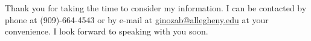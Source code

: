 \documentclass[11pt,a4paper,sans]{moderncv}        %
\begin{document}
Thank you for taking the time to consider my information. I can be contacted by phone at (909)-664-4543 or by e-mail at \href{mailto:ginozab@allegheny.edu}{ginozab@allegheny.edu} at your convenience. I look forward to speaking with you soon. 









\end{document}
